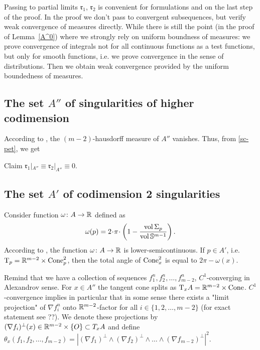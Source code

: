 \documentclass[a4paper,10pt]{article}
\begin{document}
  Passing to partial limits
 $\mathfrak{r}_1$, $\mathfrak{r}_2$
is convenient for formulations and on the last step of the proof. In the proof we don't pass to
convergent subsequences, but verify weak convergence of
measures directly.
While there is still
the point (in the proof of Lemma~\ref{A^0}) where we strongly rely on uniform boundness 
of measures: we prove convergence of integrals 
not for all continuous functions as a test functions, but
only for
smooth functions, i.e. we prove convergence in the sense 
of distributions. Then we  obtain weak
convergence  provided by the uniform boundedness of measures.   




\subsection{The set $A''$ of  singularities of higher codimension }
According to \cite[10.6]{BGP}, the $(m-2)$-hausdorff measure of $A''$ vanishes.
Thus, from \ref{sc-pet}, we get

\begin{thm}{Claim}\label{A''}
$\mathfrak{r}_1|_{A''}\equiv\mathfrak{r}_2|_{A''}\equiv0$.
\end{thm}

\subsection{The set $A'$ of codimension 2 singularities  }
Consider function $\omega\colon A\to\mathbb{R}$ defined as
$$\omega(p)=2\cdot\pi\cdot\l(1-\frac{\vol\Sigma_p}{\vol\SS^{m-1}}\r).$$
According to \cite[7.14]{BGP}, the
function $\omega\colon A\to\mathbb{R}$ is lower-semicontinuous.
If $p\in A'$, i.e. $\text{\rm T}_p=\mathbb{R}^{m-2}\times \operatorname{Cone}^2_p$, then the total angle of $\operatorname{Cone}^2_x$ is equal to $2\pi-\omega(x)$.

Remind that we have a  collection of 
sequences $f_1^n,f_2^n,\dots,f_{m-2}^n$,  $C^1$-converging in Alexandrov sense.
For $x\in A''$ the tangent cone splits as
$\text{\rm T}_xA=\mathbb{R}^{m-2}\times \operatorname{Cone}$.  
$C^1$-convergence implies in particular 
that 
in some sense there exists  a "limit projection" of $\nabla f_i^n$ onto $\mathbb{R}^{m-2}$-factor for all $i\in \{1, 2, \dots, m-2\}$
(for exact statement see ??). We denote these projections by
$(\nabla f_i)^\bot(x)\in\mathbb{R}^{m-2}\times \{O\}\subset T_xA$
and define $\theta_x(f_1,f_2,\dots,f_{m-2})=
|(\nabla f_1)^\bot \wedge (\nabla f_2)^\bot\wedge\dots
  \wedge (\nabla f_{m-2})^\bot|^2$. 
\end{document}
